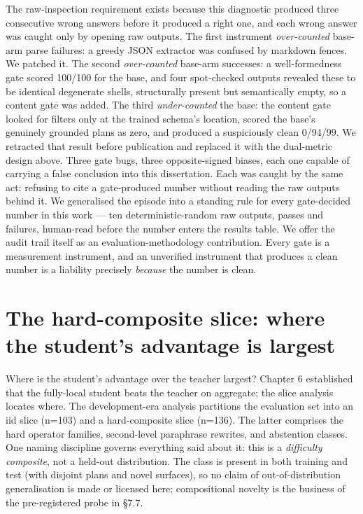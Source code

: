 \documentclass[10pt]{article} %
\begin{document}
The raw-inspection requirement exists because this diagnostic produced three consecutive wrong answers before it produced a right one, and each wrong answer was caught only by opening raw outputs. The first instrument \emph{over-counted} base-arm parse failures: a greedy JSON extractor was confused by markdown fences. We patched it. The second \emph{over-counted} base-arm successes: a well-formedness gate scored 100/100 for the base, and four spot-checked outputs revealed these to be identical degenerate shells, structurally present but semantically empty, so a content gate was added. The third \emph{under-counted} the base: the content gate looked for filters only at the trained schema's location, scored the base's genuinely grounded plans as zero, and produced a suspiciously clean 0/94/99. We retracted that result before publication and replaced it with the dual-metric design above. Three gate bugs, three opposite-signed biases, each one capable of carrying a false conclusion into this dissertation. Each was caught by the same act: refusing to cite a gate-produced number without reading the raw outputs behind it. We generalised the episode into a standing rule for every gate-decided number in this work --- ten deterministic-random raw outputs, passes and failures, human-read before the number enters the results table. We offer the audit trail itself as an evaluation-methodology contribution. Every gate is a measurement instrument, and an unverified instrument that produces a clean number is a liability precisely \emph{because} the number is clean.

\section{The hard-composite slice: where the student's advantage is largest}\label{sec:the-hard-composite-slice-where-the-stude}

Where is the student's advantage over the teacher largest? Chapter 6 established that the fully-local student beats the teacher on aggregate; the slice analysis locates where. The development-era analysis partitions the evaluation set into an iid slice (n=103) and a hard-composite slice (n=136). The latter comprises the hard operator families, second-level paraphrase rewrites, and abstention classes. One naming discipline governs everything said about it: this is a \emph{difficulty composite}, not a held-out distribution. The class is present in both training and test (with disjoint plans and novel surfaces), so no claim of out-of-distribution generalisation is made or licensed here; compositional novelty is the business of the pre-registered probe in \S7.7.
\end{document}
